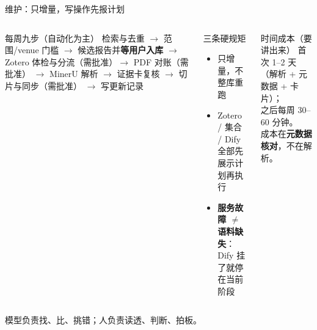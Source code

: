 \begin{frame}{维护：只增量，写操作先报计划}
  \vspace{-2pt}
  \begin{columns}[T]
    \scriptsize
    \begin{block}{每周九步（自动化为主）}
      检索与去重 $\to$ 范围/venue 门槛 $\to$ 候选报告并\textbf{等用户入库}
      $\to$ Zotero 体检与分流（需批准）$\to$ PDF 对账（需批准）
      $\to$ MinerU 解析 $\to$ 证据卡复核 $\to$ 切片与同步（需批准）
      $\to$ 写更新记录
    \end{block}

    \footnotesize
    \begin{block}{三条硬规矩}
      \scriptsize
      \begin{itemize}
        \item 只增量，不整库重跑
        \item Zotero / 集合 / Dify 全部先展示计划再执行
        \item \textbf{服务故障 $\neq$ 语料缺失}：Dify 挂了就停在当前阶段
      \end{itemize}
    \end{block}

    \begin{alertblock}{时间成本（要讲出来）}
      \scriptsize
      首次 1--2 天（解析 + 元数据 + 卡片）；\\
      之后每周 30--60 分钟。\\
      成本在\textbf{元数据核对}，不在解析。
    \end{alertblock}
  \end{columns}

  \vspace{0.3em}
  {\scriptsize 模型负责找、比、挑错；人负责读透、判断、拍板。}
\end{frame}
